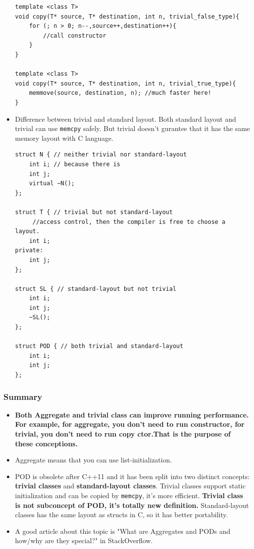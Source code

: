 \documentclass[a4paper,11pt,twoside]{book}
\begin{document}
\begin{itemize}
\begin{lstlisting}[numbers=none]
template <class T> 
void copy(T* source, T* destination, int n, trivial_false_type){
	for (; n > 0; n--,source++,destination++){
		//call constructor
	}
}
	
template <class T> 
void copy(T* source, T* destination, int n, trivial_true_type){
	memmove(source, destination, n); //much faster here!
}
\end{lstlisting}

\item Difference between trivial and standard layout. Both standard layout and trivial can use \texttt{memcpy} safely. But trivial doesn't gurantee that it has the same memory layout with C language.
\begin{lstlisting}[numbers=none]
struct N { // neither trivial nor standard-layout
	int i; // because there is 
	int j;
	virtual ~N();
};

struct T { // trivial but not standard-layout
	 //access control, then the compiler is free to choose a layout.
	int i;
private:
	int j;
};

struct SL { // standard-layout but not trivial
	int i;
	int j;
	~SL();
};

struct POD { // both trivial and standard-layout
	int i;
	int j;
};
\end{lstlisting}	
	
\end{itemize}


\subsubsection{Summary}
\begin{itemize}
		\item \textbf{Both Aggregate and trivial class can improve running performance. For example, for aggregate, you don't need to run constructor, for trivial, you don't need to run copy ctor.That is the purpose of these conceptions.}

	\item Aggregate means that you can use list-initialization.

	\item POD is obsolete after C++11 and it has been split into two distinct concepts: \textbf{trivial classes} and \textbf{standard-layout classes}. Trivial classes support static initialization and can be copied by \texttt{memcpy}, it's more efficient. \textbf{Trivial class is not subconcept of POD, it's totally new definition.}  Standard-layout classes has the same layout as structs in C, so it has better portability.

	\item A good article about this topic is "What are Aggregates and PODs and how/why are they special?" in StackOverflow. 
\end{itemize}
\end{document}
